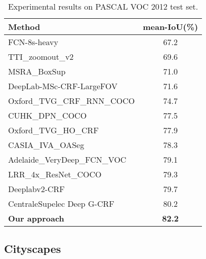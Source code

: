 \documentclass[10pt,twocolumn,letterpaper]{article}
\begin{document}
   \begin{table}[h]
      \begin{center}
         \begin{tabular}{l|c}
            \hline
            Method & mean-IoU(\%) \\
            \hline
            FCN-8s-heavy \cite{shelhamer2016fully} & 67.2 \\
            \hline
            TTI\_zoomout\_v2 \cite{mostajabi2015feedforward} & 69.6 \\
            MSRA\_BoxSup \cite{dai2015boxsup} &  71.0 \\
            DeepLab-MSc-CRF-LargeFOV \cite{chen14semantic} & 71.6 \\
            Oxford\_TVG\_CRF\_RNN\_COCO \cite{zheng2015conditional} & 74.7\\
            CUHK\_DPN\_COCO \cite{liu2015semantic} & 77.5 \\
            Oxford\_TVG\_HO\_CRF \cite{arnab2016higher} & 77.9 \\
            CASIA\_IVA\_OASeg \cite{wang2016objectness} & 78.3 \\
            Adelaide\_VeryDeep\_FCN\_VOC \cite{wu2016high} & 79.1 \\
            LRR\_4x\_ResNet\_COCO \cite{ghiasi2016laplacian} & 79.3 \\
            Deeplabv2-CRF \cite{chen2016deeplab} & 79.7\\
            CentraleSupelec Deep G-CRF\cite{chandra2016fast} & 80.2 \\
            \hline
            \textbf{Our approach} & \textbf{82.2} \\
            \hline
         \end{tabular}
      \end{center}
      \caption{Experimental results on PASCAL VOC 2012 test set.}
      \label{table:psacal-test}
   \end{table}
\subsection{Cityscapes}
\label{sec:cityscapes}
   
\end{document}
